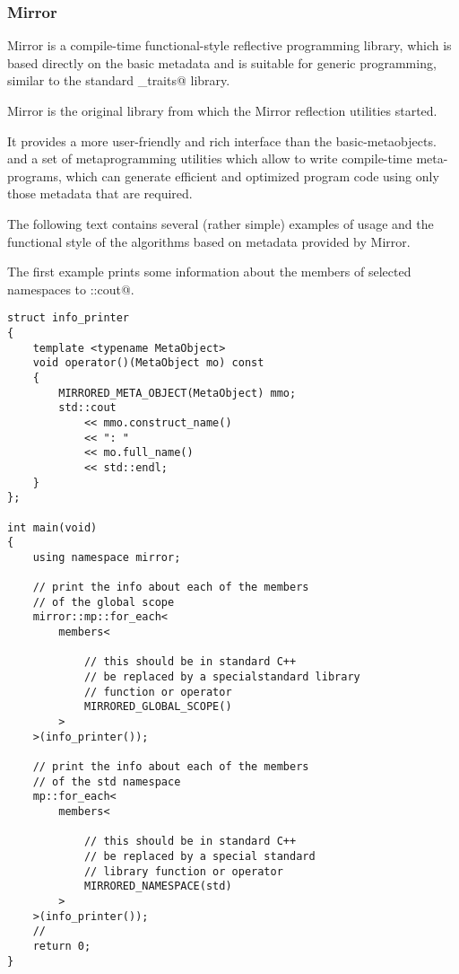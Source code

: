 \subsubsection{Mirror}

Mirror is a compile-time functional-style reflective programming library,
which is based directly on the basic metadata and is suitable for generic programming,
similar to the standard \verb@type_traits@ library.

Mirror is the original library from which the Mirror reflection utilities started.

It provides a more user-friendly and rich interface than the basic-metaobjects.
and a set of metaprogramming utilities which allow
to write compile-time meta-programs, which can generate efficient
and optimized program code using only those metadata that are required.

The following text contains several (rather simple) examples of usage
and the functional style of the algorithms based on metadata provided by Mirror.

The first example prints some information about the members of selected
namespaces to \verb@std::cout@.

\begin{lstlisting}
struct info_printer
{
    template <typename MetaObject>
    void operator()(MetaObject mo) const
    {
        MIRRORED_META_OBJECT(MetaObject) mmo;
        std::cout
            << mmo.construct_name()
            << ": "
            << mo.full_name()
            << std::endl;
    }
};

int main(void)
{
    using namespace mirror;

    // print the info about each of the members
    // of the global scope
    mirror::mp::for_each<
        members<

            // this should be in standard C++
            // be replaced by a specialstandard library
            // function or operator
            MIRRORED_GLOBAL_SCOPE()
        >
    >(info_printer());

    // print the info about each of the members
    // of the std namespace
    mp::for_each<
        members<

            // this should be in standard C++
            // be replaced by a special standard
            // library function or operator
            MIRRORED_NAMESPACE(std)
        >
    >(info_printer());
    //
    return 0;
}
\end{lstlisting}

